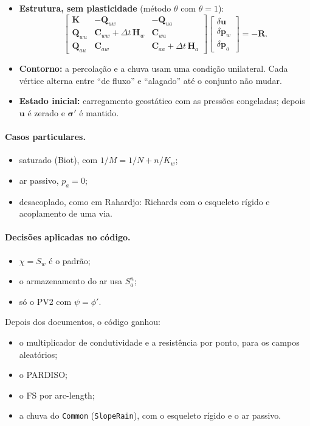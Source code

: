 \begin{itemize}
    pelos termos advectivos. A LU é não simétrica (PARDISO, ou skyline). No FS só entra $\bm J_{uu}$, que é simétrico.
  \item \textbf{Estrutura, sem plasticidade} (método $\theta$ com $\theta = 1$):
    \[
      \begin{bmatrix} \bm K & -\bm Q_{uw} & -\bm Q_{ua} \\ \bm Q_{wu} & \bm C_{ww} + \Delta t\,\bm H_w & \bm C_{wa} \\
      \bm Q_{au} & \bm C_{aw} & \bm C_{aa} + \Delta t\,\bm H_a \end{bmatrix}
      \begin{bmatrix} \delta\bm u \\ \delta\bm p_w \\ \delta\bm p_a \end{bmatrix} = -\bm R .
    \]
  \item \textbf{Contorno:} a percolação e a chuva usam uma condição unilateral. Cada vértice alterna entre ``de fluxo'' e
    ``alagado'' até o conjunto não mudar.
  \item \textbf{Estado inicial:} carregamento geostático com as pressões congeladas; depois $\bm u$ é zerado e
    $\bm\sigma'$ é mantido.
\end{itemize}

\paragraph{Casos particulares.}
\begin{itemize}
  \item saturado (Biot), com $1/M = 1/N + n/K_w$;
  \item ar passivo, $p_a = 0$;
  \item desacoplado, como em Rahardjo: Richards com o esqueleto rígido e acoplamento de uma via.
\end{itemize}

\paragraph{Decisões aplicadas no código.}
\begin{itemize}
  \item $\chi = S_w$ é o padrão;
  \item o armazenamento do ar usa $S_a^n$;
  \item só o PV2 com $\psi = \phi'$.
\end{itemize}
Depois dos documentos, o código ganhou:
\begin{itemize}
  \item o multiplicador de condutividade e a resistência por ponto, para os campos aleatórios;
  \item o PARDISO;
  \item o FS por arc-length;
  \item a chuva do \texttt{Common} (\texttt{SlopeRain}), com o esqueleto rígido e o ar passivo.
\end{itemize}

